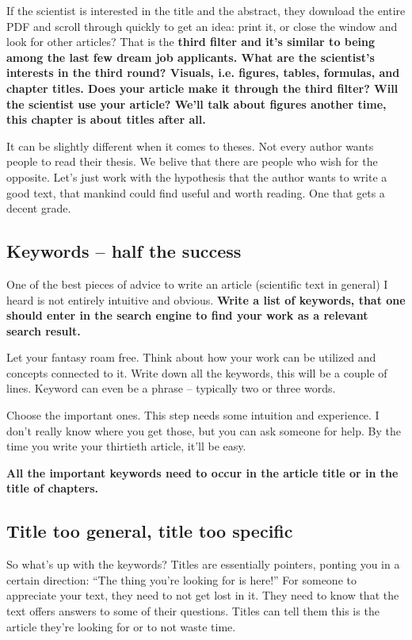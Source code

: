 If the scientist is interested in the title and the abstract, they download the entire PDF and scroll through quickly to get an idea: print it, or close the window and look for other articles? That is the \bf third filter \rm and it's similar to being among the last few dream job applicants. What are the scientist's interests in the third round? Visuals, i.e. figures, tables, formulas, and chapter titles. Does your article make it through the third filter? Will the scientist use your article? We'll talk about figures another time, this chapter is about titles after all.

It can be slightly different when it comes to theses. Not every author wants people to read their thesis. We belive that there are people who wish for the opposite. Let's just work with the hypothesis that the author wants to write a good text, that mankind could find useful and worth reading. One that gets a decent grade.


\subsection*{Keywords -- half the success}

One of the best pieces of advice to write an article (scientific text in general) I heard is not entirely intuitive and obvious.
\bf Write a list of keywords, that one should enter in the search engine to find your work as a relevant search result. \rm

Let your fantasy roam free. Think about how your work can be utilized and concepts connected to it. Write down all the keywords, this will be a couple of lines. Keyword can even be a phrase -- typically two or three words.

Choose the important ones. This step needs some intuition and experience. I don't really know where you get those, but you can ask someone for help. By the time you write your thirtieth article, it'll be easy.

\bf All the important keywords need to occur in the article title or in the title of chapters. \rm 

\subsection*{Title too general, title too specific}

So what's up with the keywords? Titles are essentially pointers, ponting you in a certain direction: ``The thing you're looking for is here!'' For someone to appreciate your text, they need to not get lost in it. They need to know that the text offers answers to some of their questions. Titles can tell them this is the article they're looking for or to not waste time.

